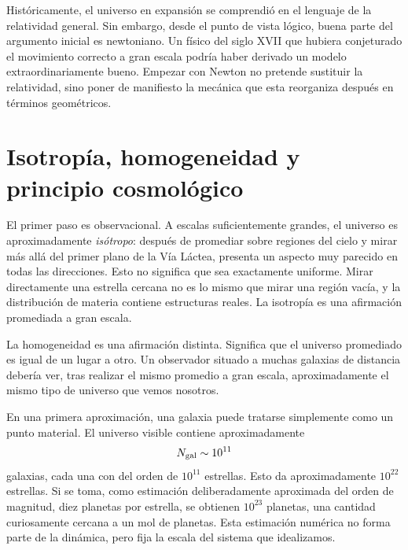 Históricamente, el universo en expansión se comprendió en el lenguaje de la relatividad general. Sin embargo, desde el punto de vista lógico, buena parte del argumento inicial es newtoniano. Un físico del siglo XVII que hubiera conjeturado el movimiento correcto a gran escala podría haber derivado un modelo extraordinariamente bueno. Empezar con Newton no pretende sustituir la relatividad, sino poner de manifiesto la mecánica que esta reorganiza después en términos geométricos.

\section{Isotropía, homogeneidad y principio cosmológico}

El primer paso es observacional. A escalas suficientemente grandes, el universo es aproximadamente \emph{isótropo}: después de promediar sobre regiones del cielo y mirar más allá del primer plano de la Vía Láctea, presenta un aspecto muy parecido en todas las direcciones. Esto no significa que sea exactamente uniforme. Mirar directamente una estrella cercana no es lo mismo que mirar una región vacía, y la distribución de materia contiene estructuras reales. La isotropía es una afirmación promediada a gran escala.

La homogeneidad es una afirmación distinta. Significa que el universo promediado es igual de un lugar a otro. Un observador situado a muchas galaxias de distancia debería ver, tras realizar el mismo promedio a gran escala, aproximadamente el mismo tipo de universo que vemos nosotros.

En una primera aproximación, una galaxia puede tratarse simplemente como un punto material. El universo visible contiene aproximadamente
\begin{equation}
N_{\rm gal}\sim 10^{11}
\end{equation}
galaxias, cada una con del orden de \(10^{11}\) estrellas. Esto da aproximadamente \(10^{22}\) estrellas. Si se toma, como estimación deliberadamente aproximada del orden de magnitud, diez planetas por estrella, se obtienen \(10^{23}\) planetas, una cantidad curiosamente cercana a un mol de planetas. Esta estimación numérica no forma parte de la dinámica, pero fija la escala del sistema que idealizamos.

\begin{classroomqa}
\end{classroomqa}

